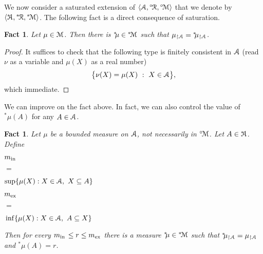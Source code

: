 \documentclass[12pt,letterpaper,oneside,reqno]{amsart}
\theoremstyle{plain}
\newtheorem{fact}[theorem]{Fact}
\theoremstyle{remark}
\begin{document}
We now consider a saturated extension of $\langle{\EuScript A},{}^{\circ\!}{\EuScript R},{}^{\circ\!}{\EuScript M}\rangle$ that we denote by $\langle{}^{*\!\!\!}{\EuScript A},{}^{*\!}{\EuScript R},{}^{*\!}{\EuScript M}\rangle$.
The following fact is a direct consequence of saturation.

\begin{fact}
  Let $\mu\in{\EuScript M}$.
  Then there is ${}^{*\!\!}\mu\in{}^{*\!}{\EuScript M}$ such that $\mu_{\restriction{\EuScript A}}={}^{*\!\!}\mu_{\restriction{\EuScript A}}$.
\end{fact}

\begin{proof}
  It suffices to check that the following type is finitely consistent in ${\EuScript A}$ (read $\nu$ as a variable and $\mu(X)$ as a real number)
  $$
  \big\{\nu(X)=\mu(X) \ :\ X\in{\EuScript A}\big\},
  $$
  which immediate.
\end{proof}

We can improve on the fact above.
In fact, we can also control the value of ${}^{*\!\!}\mu(A)$ for any $A\in{\EuScript A}$.

\def\ceq#1#2#3{\parbox[t]{25ex}{$\displaystyle #1$}\parbox{5ex}{\hfil $#2$}{$\displaystyle #3$}}

\begin{fact}
  Let $\mu$ be a bounded measure on ${\EuScript A}$, not necessarily in ${}^{\circ\!}{\EuScript M}$.
  Let $A\in{}^{*\!\!\!}{\EuScript A}$.
  Define 
  
  \ceq{\hfill m_{\rm in\,}}{=}{\sup\{\mu(X): X\in{\EuScript A},\ X\subseteq A\}}

  \ceq{\hfill m_{\rm ex}}{=}{\,\inf\{\mu(X): X\in{\EuScript A}, \  A\subseteq X \}}

  Then for every $m_{\rm in\,}\le r\le m_{\rm ex}$ there is a measure ${}^{*\!\!}\mu\in{}^{*\!}{\EuScript M}$ such that ${}^{*\!\!}\mu_{\restriction{\EuScript A}}=\mu_{\restriction{\EuScript A}}$ and  ${}^{*\!\!}\mu(A)=r$.
\end{fact}
\end{document}
